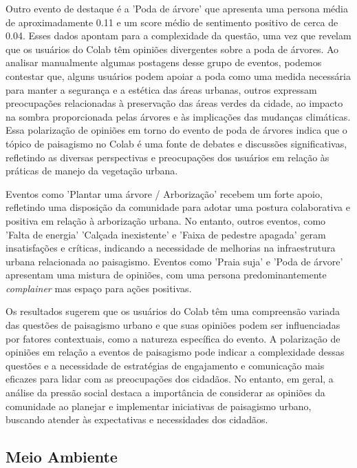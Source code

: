 Outro evento de destaque é a 'Poda de árvore' que apresenta uma persona média de aproximadamente 0.11 e um score médio de sentimento positivo de cerca de 0.04. Esses dados apontam para a complexidade da questão, uma vez que revelam que os usuários do Colab têm opiniões divergentes sobre a poda de árvores. Ao analisar manualmente algumas postagens desse grupo de eventos, podemos contestar que, alguns usuários podem apoiar a poda como uma medida necessária para manter a segurança e a estética das áreas urbanas, outros expressam preocupações relacionadas à preservação das áreas verdes da cidade, ao impacto na sombra proporcionada pelas árvores e às implicações das mudanças climáticas. Essa polarização de opiniões em torno do evento de poda de árvores indica que o tópico de paisagismo no Colab é uma fonte de debates e discussões significativas, refletindo as diversas perspectivas e preocupações dos usuários em relação às práticas de manejo da vegetação urbana.

Eventos como 'Plantar uma árvore / Arborização' recebem um forte apoio, refletindo uma disposição da comunidade para adotar uma postura colaborativa e positiva em relação à arborização urbana. No entanto, outros eventos, como 'Falta de energia' 'Calçada inexistente' e 'Faixa de pedestre apagada' geram insatisfações e críticas, indicando a necessidade de melhorias na infraestrutura urbana relacionada ao paisagismo. Eventos como 'Praia suja' e 'Poda de árvore' apresentam uma mistura de opiniões, com uma persona predominantemente \textit{complainer} mas espaço para ações positivas.

Os resultados sugerem que os usuários do Colab têm uma compreensão variada das questões de paisagismo urbano e que suas opiniões podem ser influenciadas por fatores contextuais, como a natureza específica do evento. A polarização de opiniões em relação a eventos de paisagismo pode indicar a complexidade dessas questões e a necessidade de estratégias de engajamento e comunicação mais eficazes para lidar com as preocupações dos cidadãos. No entanto, em geral, a análise da pressão social destaca a importância de considerar as opiniões da comunidade ao planejar e implementar iniciativas de paisagismo urbano, buscando atender às expectativas e necessidades dos cidadãos.

\subsection{Meio Ambiente}

